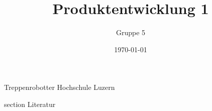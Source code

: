\documentclass[oneside]{modern}
\title{Produktentwicklung 1}
\author{Gruppe 5}
\date{\today}
\begin{document}
   \renewcommand{\thesection}{\arabic{section}}

  \nocite{*}

  \firstpage
    {Treppenrobotter}
    {Hochschule Luzern}
    {\theauthor}

  \addtableofcontents

  \newpage
  
  


  
  
  

  \newpage
  \addglossary

  \newpage
    {section}
    {Literatur}

  \printbibliography[
    heading=subbibliography
  ]

  \newpage
  \listoffigures
\end{document}
